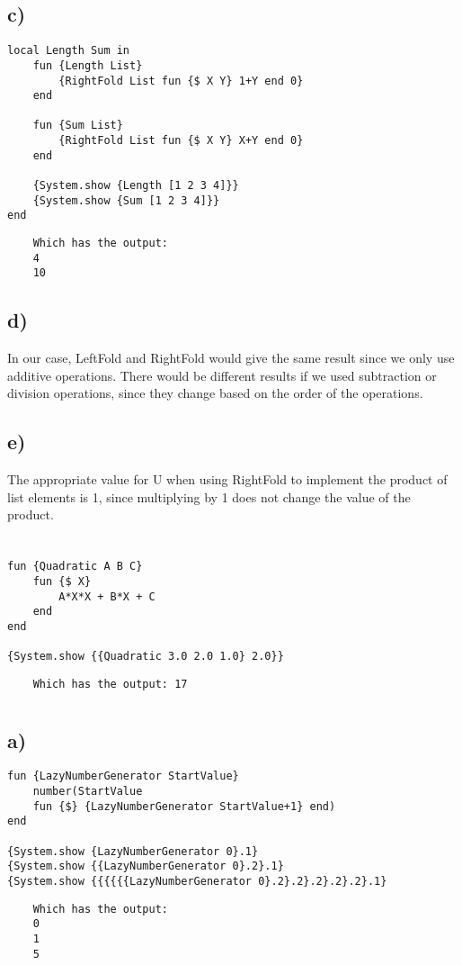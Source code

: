 \documentclass[11pt,a4paper]{report}
\begin{document}
\subsection{c)}
\begin{lstlisting}[language=Oz]
    local Length Sum in
    fun {Length List} 
        {RightFold List fun {$ X Y} 1+Y end 0}
    end

    fun {Sum List}
        {RightFold List fun {$ X Y} X+Y end 0}
    end

    {System.show {Length [1 2 3 4]}}
    {System.show {Sum [1 2 3 4]}}
end
\end{lstlisting}
\begin{verbatim}
    Which has the output: 
    4 
    10
\end{verbatim}

\subsection{d)}
In our case, LeftFold and RightFold would give the same result since we only use additive operations.
There would be different results if we used subtraction or division operations, since they change based on the order of the operations.

\subsection{e)}
The appropriate value for U when using RightFold to implement the product of list elements is 1, since multiplying by 1 does not change the value of the product.

\newpage
\section{}
\begin{lstlisting}[language=Oz]
fun {Quadratic A B C}
    fun {$ X}
        A*X*X + B*X + C
    end
end

{System.show {{Quadratic 3.0 2.0 1.0} 2.0}}

\end{lstlisting}
\begin{verbatim}
    Which has the output: 17
\end{verbatim}

\section{}
\subsection{a)}
\begin{lstlisting}[language=Oz]
fun {LazyNumberGenerator StartValue}
    number(StartValue
    fun {$} {LazyNumberGenerator StartValue+1} end)
end

{System.show {LazyNumberGenerator 0}.1}
{System.show {{LazyNumberGenerator 0}.2}.1}
{System.show {{{{{{LazyNumberGenerator 0}.2}.2}.2}.2}.2}.1}
\end{lstlisting}
\begin{verbatim}
    Which has the output:
    0
    1
    5
\end{verbatim}
\end{document}
